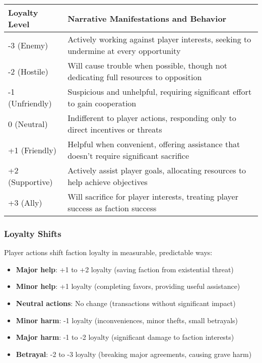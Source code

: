 \begin{fatebox}
\begin{tabularx}{\textwidth}{lX}
\toprule
\textbf{Loyalty Level} & \textbf{Narrative Manifestations and Behavior} \\
\midrule
-3 (Enemy) & Actively working against player interests, seeking to undermine at every opportunity \\
-2 (Hostile) & Will cause trouble when possible, though not dedicating full resources to opposition \\
-1 (Unfriendly) & Suspicious and unhelpful, requiring significant effort to gain cooperation \\
0 (Neutral) & Indifferent to player actions, responding only to direct incentives or threats \\
+1 (Friendly) & Helpful when convenient, offering assistance that doesn't require significant sacrifice \\
+2 (Supportive) & Actively assist player goals, allocating resources to help achieve objectives \\
+3 (Ally) & Will sacrifice for player interests, treating player success as faction success \\
\bottomrule
\end{tabularx}
\end{fatebox}

\subsubsection*{Loyalty Shifts}

Player actions shift faction loyalty in measurable, predictable ways:

\begin{itemize}
    \item \textbf{Major help}: +1 to +2 loyalty (saving faction from existential threat)
    \item \textbf{Minor help}: +1 loyalty (completing favors, providing useful assistance)
    \item \textbf{Neutral actions}: No change (transactions without significant impact)
    \item \textbf{Minor harm}: -1 loyalty (inconveniences, minor thefts, small betrayals)
    \item \textbf{Major harm}: -1 to -2 loyalty (significant damage to faction interests)
    \item \textbf{Betrayal}: -2 to -3 loyalty (breaking major agreements, causing grave harm)
\end{itemize}

